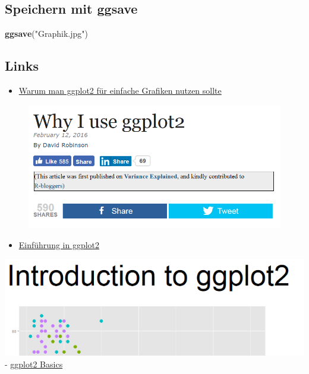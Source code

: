 \documentclass[]{article}
\newenvironment{Shaded}{\begin{snugshade}}{\end{snugshade}}
\newcommand{\KeywordTok}[1]{\textcolor[rgb]{0.13,0.29,0.53}{\textbf{{#1}}}}
\newcommand{\StringTok}[1]{\textcolor[rgb]{0.31,0.60,0.02}{{#1}}}
\newcommand{\NormalTok}[1]{{#1}}
\providecommand{\tightlist}{%
  \setlength{\itemsep}{0pt}\setlength{\parskip}{0pt}}
\begin{document}
\subsection{Speichern mit ggsave}\label{speichern-mit-ggsave}

\begin{Shaded}
\begin{Highlighting}[]
\KeywordTok{ggsave}\NormalTok{(}\StringTok{"Graphik.jpg"}\NormalTok{)}
\end{Highlighting}
\end{Shaded}

\subsection{Links}\label{links-1}

\begin{itemize}
\tightlist
\item
  \href{http://www.r-bloggers.com/why-i-use-ggplot2/}{Warum man ggplot2
  für einfache Grafiken nutzen sollte}
\end{itemize}

\begin{figure}[htbp]
\centering
\includegraphics{figure/WhyIuseggplot2.PNG}
\caption{}
\end{figure}

\begin{itemize}
\tightlist
\item
  \href{https://opr.princeton.edu/workshops/Downloads/2015Jan_ggplot2Koffman.pdf}{Einführung
  in ggplot2}
\end{itemize}

\includegraphics{figure/introggplot2.PNG} -
\href{http://tutorials.iq.harvard.edu/R/Rgraphics/Rgraphics.html}{ggplot2
Basics}
\end{document}
